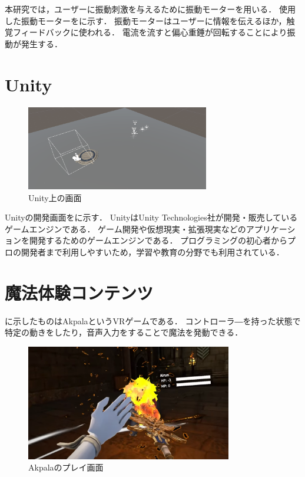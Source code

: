 本研究では，ユーザーに振動刺激を与えるために振動モーターを用いる．
使用した振動モーターをに示す．
振動モーターはユーザーに情報を伝えるほか，触覚フィードバックに使われる．
電流を流すと偏心重錘が回転することにより振動が発生する．

\section{Unity}

\begin{figure}[h]
\centering
\includegraphics[clip,width=8cm]{./fig/unity_first.png}
\caption{Unity上の画面}\label{unity}
\end{figure}

Unityの開発画面をに示す．
Unity\cite{unity}はUnity Technologies社が開発・販売しているゲームエンジンである．
ゲーム開発や仮想現実・拡張現実などのアプリケーションを開発するためのゲームエンジンである．
プログラミングの初心者からプロの開発者まで利用しやすいため，学習や教育の分野でも利用されている．



\newpage
\section{魔法体験コンテンツ}
に示したものはAkpala\cite{maho}というVRゲームである．
コントローラ―を持った状態で特定の動きをしたり，音声入力をすることで魔法を発動できる．

\begin{figure}[h]
    \centering
    \includegraphics[clip,width=9cm]{fig/mahouCont.png}
    \caption{Akpalaのプレイ画面}\label{MC}
    \end{figure}

